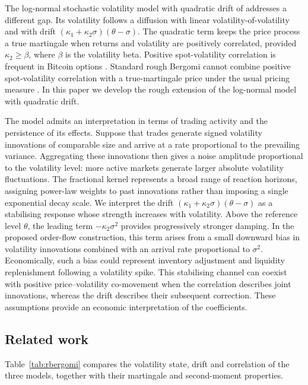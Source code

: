 \documentclass[11pt,a4paper]{article}
\theoremstyle{definition}
\begin{document}
The log-normal stochastic volatility model with quadratic drift of \citet{SeppRakhmonov2023} addresses a different gap. Its volatility follows a diffusion with linear volatility-of-volatility and with drift $(\kappa_1+\kappa_2\sigma)(\theta-\sigma)$. The quadratic term keeps the price process a true martingale when returns and volatility are positively correlated, provided $\kappa_2\ge\beta$, where $\beta$ is the volatility beta. Positive spot-volatility correlation is frequent in Bitcoin options \citep{SeppRakhmonov2023}. Standard rough Bergomi cannot combine positive spot-volatility correlation with a true-martingale price under the usual pricing measure \citep{Gassiat2019}. In this paper we develop the rough extension of the log-normal model with quadratic drift.

The model admits an interpretation in terms of trading activity and
the persistence of its effects. Suppose that trades generate signed
volatility innovations of comparable size and arrive at a rate
proportional to the prevailing variance. Aggregating these innovations
then gives a noise amplitude proportional to the volatility level:
more active markets generate larger absolute volatility fluctuations.
The fractional kernel represents a broad range of reaction horizons,
assigning power-law weights to past innovations rather than imposing
a single exponential decay scale. We interpret the drift
$(\kappa_1+\kappa_2\sigma)(\theta-\sigma)$ as a stabilising response
whose strength increases with volatility. Above the reference level
$\theta$, the leading term $-\kappa_2\sigma^2$ provides progressively
stronger damping. In the proposed order-flow construction, this term
arises from a small downward bias in volatility innovations combined
with an arrival rate proportional to $\sigma^2$. Economically, such
a bias could represent inventory adjustment and liquidity
replenishment following a volatility spike. This stabilising channel
can coexist with positive price--volatility co-movement when the
correlation describes joint innovations, whereas the drift describes
their subsequent correction. These assumptions provide an economic
interpretation of the coefficients.


\subsection{Related work}\label{sec:literature}
Table~\ref{tab:rbergomi} compares the volatility state, drift and correlation of the three models, together with their martingale and second-moment properties.
\end{document}
